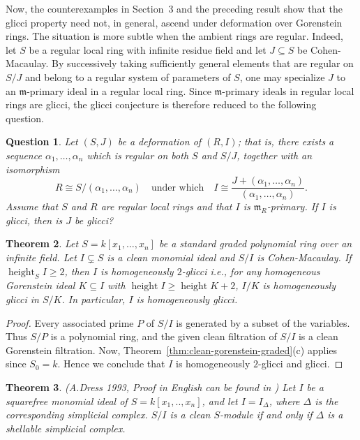 \documentclass[11pt,letterpaper]{amsart}
\newcommand{\seq}{\subseteq}
\DeclareMathOperator{\height}{height}
\theoremstyle{plain}
\newtheorem{thm}{Theorem}[section]
\newtheorem{question}[thm]{Question}
\theoremstyle{definition}
\theoremstyle{remark}
\begin{document}
Now, the counterexamples in Section~3 and the preceding result show that the glicci property need not, in general, ascend under
deformation over Gorenstein rings. The situation is more subtle when
the ambient rings are regular. Indeed, let $S$ be a regular local ring
with infinite residue field and let $J\subseteq S$ be Cohen-Macaulay.
By successively taking sufficiently general elements that are regular
on $S/J$ and belong to a regular system of parameters of $S$, one may
specialize $J$ to an $\mathfrak m$-primary ideal in a regular local
ring. Since $\mathfrak m$-primary ideals in regular local rings are
glicci, the glicci conjecture is therefore reduced to the following
question.

\begin{question}\label{deformationquestion}
    Let $(S,J)$ be a deformation of $(R,I)$; that is, there exists
a sequence $\alpha_1,\ldots,\alpha_n$ which is regular on both $S$ and
$S/J$, together with an isomorphism
\[
R \cong S/(\alpha_1,\ldots,\alpha_n)\quad\text{under which}\quad 
I \cong
\frac{J+(\alpha_1,\ldots,\alpha_n)}
     {(\alpha_1,\ldots,\alpha_n)}.
\]
Assume that $S$ and $R$ are regular local rings and that $I$ is
$\mathfrak m_R$-primary. If $I$ is glicci, then is $J$ be glicci?
\end{question}


\begin{thm}\label{thm:clean-monomial-application}
Let $S=k[x_1,\ldots,x_n]$ be a standard graded polynomial ring over an
infinite field. Let $I\subsetneq S$ is a clean monomial ideal and $S/I$
is Cohen-Macaulay. If
$\height_S I\geq 2$, then $I$ is homogeneously $2$-glicci i.e., for any homogeneous Gorenstein ideal $K\seq I$ with $\height I\ge \height K+2$, $I/K$ is homogeneously glicci in $S/K$. In particular, $I$ is homogeneously glicci.
\end{thm}

\begin{proof}
Every associated prime $P$ of $S/I$ is generated by a subset of the
variables. Thus $S/P$ is a polynomial ring, and the given clean filtration
of $S/I$ is a clean Gorenstein filtration. Now, Theorem~\ref{thm:clean-gorenstein-graded}\textup{(c)} applies since $S_0=k$. Hence we conclude that $I$ is homogeneously $2$-glicci and glicci. 
\end{proof}

\begin{thm}(A.Dress 1993, Proof in English can be found in \cite[Theorem~2.1.1]{simon1994combinatorial})  Let $I$ be a squarefree monomial ideal of $S=k[x_1,..,x_n]$, and let $I=I_\Delta$, where $\Delta$ is the corresponding simplicial complex.
$S/I$ is a clean $S$-module if and only if $\Delta$ is a shellable simplicial complex. 
\end{thm}
\end{document}
